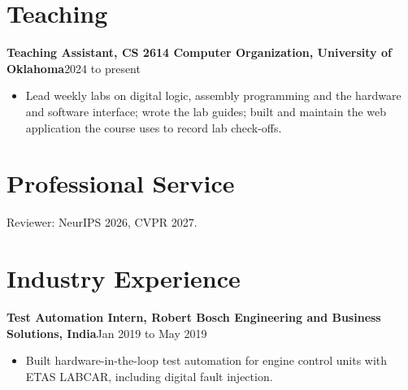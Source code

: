 \documentclass[11pt,letterpaper]{article}
\newcommand{\entry}[2]{\textbf{#1}\hfill #2\par}
\begin{document}
\section{Teaching}
\entry{Teaching Assistant, CS 2614 Computer Organization, University of Oklahoma}{2024 to present}
\begin{itemize}
  \item Lead weekly labs on digital logic, assembly programming and the hardware and software interface; wrote the
    lab guides; built and maintain the web application the course uses to record lab check-offs.
\end{itemize}

\section{Professional Service}
Reviewer: NeurIPS 2026, CVPR 2027.

\section{Industry Experience}
\entry{Test Automation Intern, Robert Bosch Engineering and Business Solutions, India}{Jan 2019 to May 2019}
\begin{itemize}
  \item Built hardware-in-the-loop test automation for engine control units with ETAS LABCAR, including digital
    fault injection.
\end{itemize}
\end{document}
